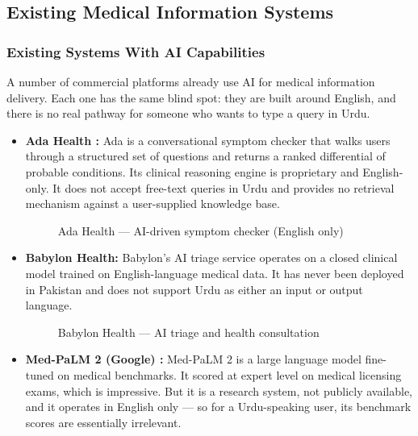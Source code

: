 \subsection{Existing Medical Information Systems}

\subsubsection{Existing Systems With AI Capabilities}

A number of commercial platforms already use AI for medical information delivery. Each one
has the same blind spot: they are built around English, and there is no real pathway for
someone who wants to type a query in Urdu.

\begin{itemize}

  \item \textbf{Ada Health \cite{adahealth2024}:} Ada is a conversational symptom checker
        that walks users through a structured set of questions and returns a ranked
        differential of probable conditions. Its clinical reasoning engine is proprietary
        and English-only. It does not accept free-text queries in Urdu and provides no
        retrieval mechanism against a user-supplied knowledge base.

        \begin{figure}[H]
          \centering
          \caption{Ada Health --- AI-driven symptom checker (English only)}
          \label{fig:ada}
        \end{figure}

  \item \textbf{Babylon Health:} Babylon's AI triage service operates on a closed clinical
        model trained on English-language medical data. It has never been deployed in
        Pakistan and does not support Urdu as either an input or output language.

        \begin{figure}[H]
          \centering
          \caption{Babylon Health --- AI triage and health consultation}
          \label{fig:babylon}
        \end{figure}

  \item \textbf{Med-PaLM 2 (Google) \cite{singhal2023medpalm}:} Med-PaLM 2 is a large
        language model fine-tuned on medical benchmarks. It scored at expert level on
        medical licensing exams, which is impressive. But it is a research system, not
        publicly available, and it operates in English only --- so for a Urdu-speaking
        user, its benchmark scores are essentially irrelevant.


\end{itemize}
